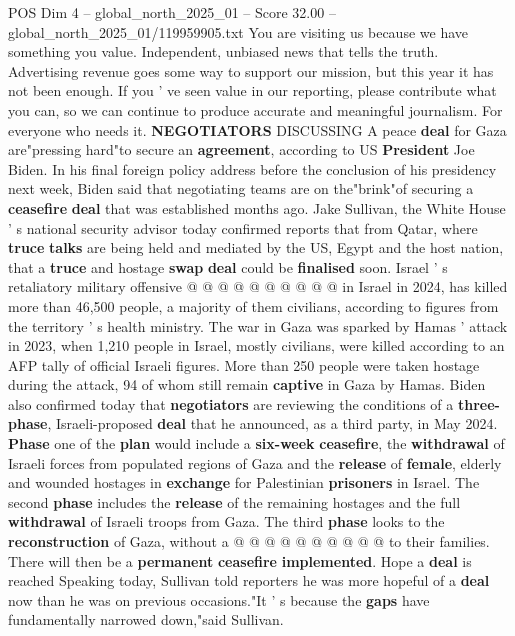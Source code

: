 \begin{textsample}{POS Dim 4 – global\_north\_2025\_01 – Score 32.00 – global\_north\_2025\_01/119959905.txt}  \label{ex:f4_pos_044}
You are visiting us because we have something you value.
Independent, unbiased news that tells the truth.
Advertising revenue goes some way to support our mission, but this year it has not been enough.
If you ' ve seen value in our reporting, please contribute what you can, so we can continue to produce accurate and meaningful journalism.
For everyone who needs it. \textbf{NEGOTIATORS} DISCUSSING A peace \textbf{deal} for Gaza are"pressing hard"to secure an \textbf{agreement}, according to US \textbf{President} Joe Biden.
In his final foreign policy address before the conclusion of his presidency next week, Biden said that negotiating teams are on the"brink"of securing a \textbf{ceasefire} \textbf{deal} that was established months ago.
Jake Sullivan, the White House ' s national security advisor today confirmed reports that from Qatar, where \textbf{truce} \textbf{talks} are being held and mediated by the US, Egypt and the host nation, that a \textbf{truce} and hostage \textbf{swap} \textbf{deal} could be \textbf{finalised} soon.
Israel ' s retaliatory military offensive @ @ @ @ @ @ @ @ @ @ in Israel in 2024, has killed more than 46,500 people, a majority of them civilians, according to figures from the territory ' s health ministry.
The war in Gaza was sparked by Hamas ' attack in 2023, when 1,210 people in Israel, mostly civilians, were killed according to an AFP tally of official Israeli figures.
More than 250 people were taken hostage during the attack, 94 of whom still remain \textbf{captive} in Gaza by Hamas.
Biden also confirmed today that \textbf{negotiators} are reviewing the conditions of a \textbf{three-phase}, Israeli-proposed \textbf{deal} that he announced, as a third party, in May 2024. \textbf{Phase} one of the \textbf{plan} would include a \textbf{six-week} \textbf{ceasefire}, the \textbf{withdrawal} of Israeli forces from populated regions of Gaza and the \textbf{release} of \textbf{female}, elderly and wounded hostages in \textbf{exchange} for Palestinian \textbf{prisoners} in Israel.
The second \textbf{phase} includes the \textbf{release} of the remaining hostages and the full \textbf{withdrawal} of Israeli troops from Gaza.
The third \textbf{phase} looks to the \textbf{reconstruction} of Gaza, without a @ @ @ @ @ @ @ @ @ @ to their families.
There will then be a \textbf{permanent} \textbf{ceasefire} \textbf{implemented}.
Hope a \textbf{deal} is reached Speaking today, Sullivan told reporters he was more hopeful of a \textbf{deal} now than he was on previous occasions."It ' s because the \textbf{gaps} have fundamentally narrowed down,"said Sullivan.

\end{textsample}
